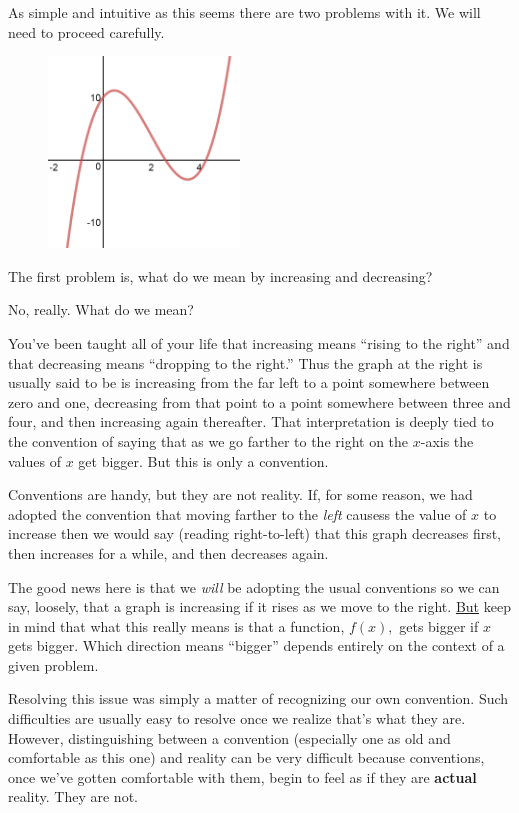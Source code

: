 As simple and intuitive as this seems there are two problems with
it. We will need to proceed carefully.

\begin{figure}
\captionsetup{labelformat=empty}
\centerline{\includegraphics*[height=2in,width=2in]{Figures/Abstract1}}
\label{fig:}
\end{figure}
The first problem is, what do we mean by increasing and decreasing? 

No, really. What do we mean?

You've been taught all of your life that increasing means ``rising to
the right'' and that decreasing means ``dropping to the right.'' Thus
the graph at the right is usually said to be is increasing from the
far left to a point somewhere between zero and one, decreasing from
that point to a point somewhere between three and four, and then
increasing again thereafter.  That interpretation is deeply tied to
the convention of saying that as we go farther to the right on the
$x$-axis the values of $x$ get bigger. But this is only a convention.

Conventions are handy, but they are not reality. If, for some reason,
we had adopted the convention that moving farther to the \emph{left}
causess the value of $x$ to increase then we would say (reading
right-to-left) that this graph decreases first, then increases for a
while, and then decreases again.

The good news here is that we \emph{will} be adopting the usual
conventions so we can say, loosely, that a graph is increasing if it
rises as we move to the right. \underline{But} keep in mind that what
this really means is that a function, $f(x),$ gets bigger if $x$ gets
bigger. Which direction means ``bigger'' depends entirely on the
context of a given problem.

Resolving this issue was simply a matter of recognizing our own
convention. Such difficulties are usually easy to resolve once we
realize that's what they are.  However, distinguishing between a
convention (especially one as old and comfortable as this one) and
reality can be very difficult because conventions, once we've gotten
comfortable with them, begin to feel as if they are {\bf actual}
reality. They are not.

